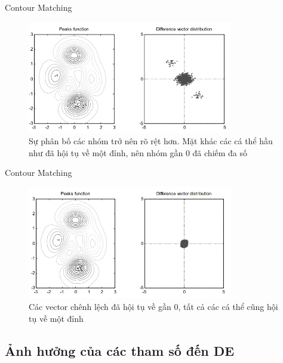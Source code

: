 \begin{frame}{Contour Matching}
  \begin{figure}
    \centering
    \includegraphics[width=0.8\textwidth,height=0.8\textheight,
    keepaspectratio]{res/cm4.png}
\captionsetup{justification=centering,margin=3cm}
    \caption{Sự phân bố các nhóm trở nên rõ rệt hơn. Mặt khác các cá thể hầu như
    đã hội tụ về một đỉnh, nên nhóm gần 0 đã chiếm đa số}
  \end{figure}
\end{frame}

\begin{frame}{Contour Matching}
  \begin{figure}
    \centering
    \includegraphics[width=0.8\textwidth,height=0.8\textheight,
    keepaspectratio]{res/cm5.png}
\captionsetup{justification=centering,margin=3cm}
    \caption{Các vector chênh lệch đã hội tụ về gần 0, tất cả các cá thể cũng
      hội tụ về một đỉnh}
  \end{figure}
\end{frame}

\subsection{Ảnh hưởng của các tham số đến DE} %
\label{sub:Ảnh hưởng của các tham số đến DE}


